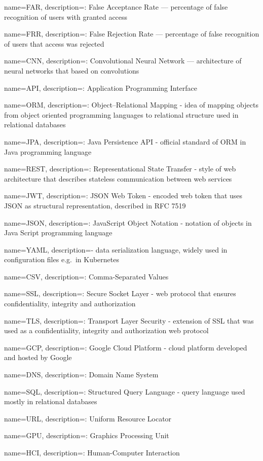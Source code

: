 \makeglossaries

{
name=FAR,
description={: False Acceptance Rate --- percentage of false recognition of users with granted access}
}

{
name=FRR,
description={: False Rejection Rate --- percentage of false recognition of users that access was rejected}
}

{
name=CNN,
description={: Convolutional Neural Network --- architecture of neural networks that based on convolutions}
}

{
name=API,
description={: Application Programming Interface}
}

{
name=ORM,
description={: Object–Relational Mapping - idea of mapping objects from object oriented programming languages to relational structure used in relational databases}
}

{
name=JPA,
description={: Java Persistence API - official standard of ORM in Java programming language}
}

{
name=REST,
description={: Representational State Transfer - style of web architecture that describes stateless communication between web services}
}

{
name=JWT,
description={: JSON Web Token - encoded web token that uses JSON as structural representation, described in RFC 7519}
}

{
name=JSON,
description={: JavaScript Object Notation - notation of objects in Java Script programming language}
}

{
name=YAML,
description={- data serialization language, widely used in configuration files e.g.\ in Kubernetes}
}

{
name=CSV,
description={: Comma-Separated Values}
}

{
name=SSL,
description={: Secure Socket Layer - web protocol that ensures confidentiality, integrity and authorization}
}

{
name=TLS,
description={: Transport Layer Security - extension of SSL that was used as a confidentiality, integrity and authorization web protocol}
}

{
name=GCP,
description={: Google Cloud Platform - cloud platform developed and hosted by Google}
}

{
name=DNS,
description={: Domain Name System}
}

{
name=SQL,
description={: Structured Query Language - query language used mostly in relational databases}
}

{
name=URL,
description={: Uniform Resource Locator}
}

{
name=GPU,
description={: Graphics Processing Unit}
}

 {
name=HCI,
description={: Human-Computer Interaction}
}


